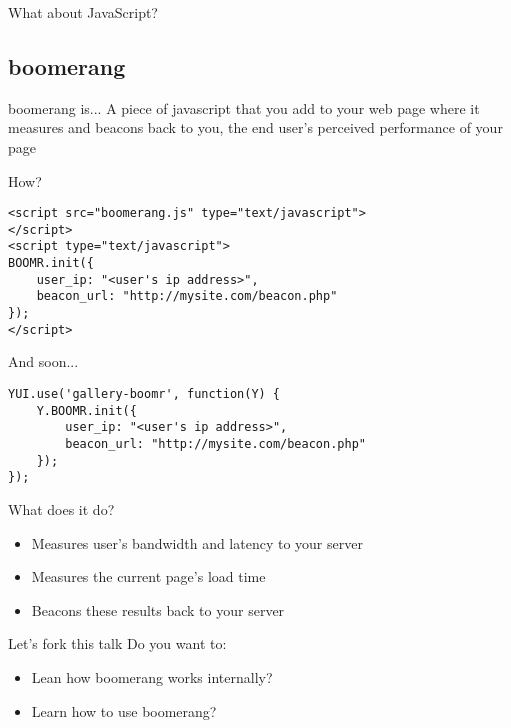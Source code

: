 \documentclass{beamer}
\begin{document}
\begin{frame}{}
  \begin{center}
  What about JavaScript?
  \end{center}
\end{frame}

\subsection{boomerang}

\begin{frame}
  \begin{block}{boomerang is...}
A piece of javascript that you add to your web page where it measures and beacons back to you, the end user's perceived performance of your page
  \end{block}
\end{frame}

\begin{frame}[fragile]{How?}
  \begin{verbatim}
<script src="boomerang.js" type="text/javascript">
</script>
<script type="text/javascript">
BOOMR.init({
    user_ip: "<user's ip address>",
    beacon_url: "http://mysite.com/beacon.php"
});
</script>
  \end{verbatim}
\end{frame}

\begin{frame}[fragile]{And soon...}
  \begin{verbatim}
YUI.use('gallery-boomr', function(Y) {
    Y.BOOMR.init({
        user_ip: "<user's ip address>",
        beacon_url: "http://mysite.com/beacon.php"
    });
});
  \end{verbatim}
\end{frame}

\begin{frame}{What does it do?}
  \begin{itemize}
  \item Measures user's bandwidth and latency to your server
  \item Measures the current page's load time
  \item Beacons these results back to your server
  \end{itemize}
\end{frame}

\begin{frame}{Let's fork this talk}
  Do you want to:
  \begin{itemize}
  \item Lean how boomerang works internally?
  \item Learn how to use boomerang?
  \end{itemize}
\end{frame}
\end{document}
